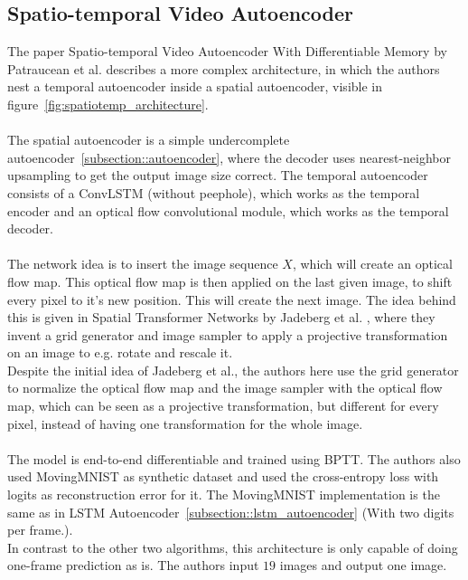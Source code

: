  \subsection{Spatio-temporal Video Autoencoder}
  The paper \glqq Spatio-temporal Video Autoencoder With Differentiable Memory\grqq{} by Patraucean et al. \cite{Patraucean2015} describes a more complex 
  architecture, in which the authors
  nest a temporal autoencoder inside a spatial autoencoder, visible in figure~\ref{fig:spatiotemp_architecture}.
  \\\\  
  The spatial autoencoder is a simple undercomplete autoencoder~\ref{subsection::autoencoder}, where the decoder uses nearest-neighbor
  upsampling to get the output image size correct. The temporal autoencoder consists of a ConvLSTM (without peephole), which works as the temporal 
  encoder and an optical flow convolutional module, which works
  as the temporal decoder.
  \\\\
  The network idea is to insert the image sequence $X$, which will create an optical flow map. This optical flow map is then applied on the last given image, to 
  shift every pixel to it's new position. This will create the next image. The idea behind this is given in \glqq Spatial Transformer Networks\grqq{} by Jadeberg et 
  al. \cite{Jadeberg2015}, where they invent a grid generator and image sampler to apply a projective transformation on an image to e.g. rotate and rescale it.\\
  Despite the initial idea
  of Jadeberg et al., the authors here use the grid generator to normalize the optical flow map and the image sampler with the optical flow map, which can be seen 
  as a projective transformation, but different for every pixel, instead of having one transformation for the whole image.
  \\\\
  The model is end-to-end differentiable and trained using BPTT. The authors also used MovingMNIST as synthetic dataset and used the cross-entropy loss with 
  logits as reconstruction error for it. The 
  MovingMNIST implementation is the same as in LSTM Autoencoder~\ref{subsection::lstm_autoencoder} (With two digits per frame.).
  \\
  In contrast to the other two algorithms, this architecture is only capable of doing one-frame prediction as is. The authors input $19$ images and output one 
  image.
  \\\\
